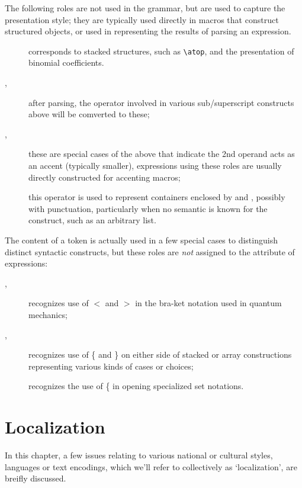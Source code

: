 \documentclass{book}
\begin{document}
The following roles are not used in the grammar, but are used to capture
the presentation style; they are typically used directly in macros that construct
structured objects, or used in representing the results of parsing an expression.
\begin{description}
\item[] corresponds to stacked structures, such as
  \verb|\atop|, and the presentation of binomial coefficients.
\item[,] after parsing, the operator involved
  in various sub/superscript constructs above will be comverted to these;
\item[,]  these are special cases of the
  above that indicate the 2nd operand acts as an accent (typically smaller),
  expressions using these roles are usually directly constructed for accenting macros;
\item[] this operator is used to represent containers enclosed by
   and , possibly with punctuation, particularly when
  no semantic is known for the construct, such as an arbitrary list.
\end{description}

The content of a token is actually used in a few special cases to distinguish
distinct syntactic constructs, but these roles are \emph{not} assigned to
the  attribute of expressions:
\begin{description}
\item[,] recognizes use of $<$ and $>$ in the bra-ket notation
  used in quantum mechanics;
\item[,] recognizes use of \{ and \} on
  either side of stacked or array constructions representing various kinds
  of cases or choices;
\item[] recognizes the use of \{ in opening specialized set notations.
\end{description}


\chapter{Localization}\label{localization}
In this chapter, a few issues relating to various national or cultural styles,
languages or text encodings, which we'll refer to collectively as `localization', are breifly discussed.
\end{document}
